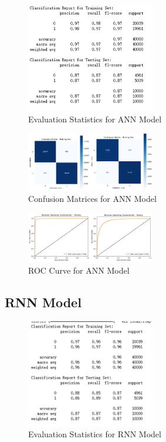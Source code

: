 \documentclass[11pt,a4paper]{article}
\begin{document}
\begin{figure}[ht]
    \centering
    \includegraphics[width=0.5\textwidth]{ann1.png}
    \caption{Evaluation Statistics for ANN Model}
    \label{fig:polarity_distribution}
\end{figure}

\begin{figure}[ht]
    \centering
    \includegraphics[width=0.5\textwidth]{ann2.png}
    \caption{Confusion Matrices for ANN Model}
    \label{fig:polarity_distribution}
\end{figure}

\begin{figure}[ht]
    \centering
    \includegraphics[width=0.5\textwidth]{ann3.png}
    \caption{ROC Curve for ANN Model}
    \label{fig:polarity_distribution}
\end{figure}


\subsection{RNN Model}


\begin{figure}[ht]
    \centering
    \includegraphics[width=0.5\textwidth]{rnn-1.png}
    \caption{Evaluation Statistics for RNN Model}
    \label{fig:polarity_distribution}
\end{figure}
\end{document}
